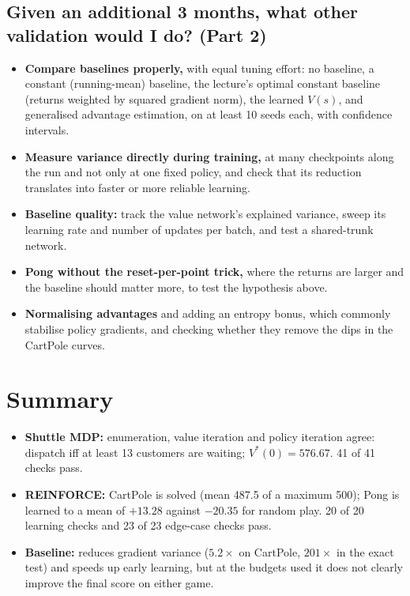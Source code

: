 \documentclass[10pt,a4paper]{article}
\begin{document}
\subsection{Given an additional 3 months, what other validation would I do? (Part 2)}
\begin{itemize}
  \item \textbf{Compare baselines properly,} with equal tuning effort: no baseline, a constant (running-mean) baseline, the lecture's optimal
        constant baseline (returns weighted by squared gradient norm), the learned $V(s)$, and generalised advantage estimation, on at least
        10 seeds each, with confidence intervals.
  \item \textbf{Measure variance directly during training,} at many checkpoints along the run and not only at one fixed policy, and check
        that its reduction translates into faster or more reliable learning.
  \item \textbf{Baseline quality:} track the value network's explained variance, sweep its learning rate and number of updates per batch,
        and test a shared-trunk network.
  \item \textbf{Pong without the reset-per-point trick,} where the returns are larger and the baseline should matter more, to test the
        hypothesis above.
  \item \textbf{Normalising advantages} and adding an entropy bonus, which commonly stabilise policy gradients, and checking whether they
        remove the dips in the CartPole curves.
\end{itemize}

\section{Summary}
\begin{itemize}
  \item \textbf{Shuttle MDP:} enumeration, value iteration and policy iteration agree: dispatch iff at least 13 customers are waiting;
        $V^*(0)=576.67$. 41 of 41 checks pass.
  \item \textbf{REINFORCE:} CartPole is solved (mean 487.5 of a maximum 500); Pong is learned to a mean of $+13.28$ against $-20.35$ for
        random play. 20 of 20 learning checks and 23 of 23 edge-case checks pass.
  \item \textbf{Baseline:} reduces gradient variance ($5.2\times$ on CartPole, $201\times$ in the exact test) and speeds up early learning,
        but at the budgets used it does not clearly improve the final score on either game.
\end{itemize}
\end{document}
